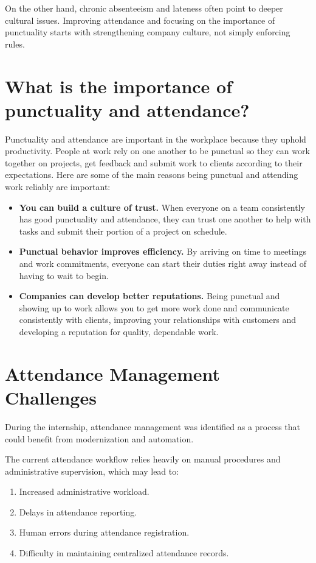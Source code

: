 \documentclass[sommairechap,stylejchiquet]{these_gi}
\begin{document}
On the other hand, chronic absenteeism and lateness often point to deeper cultural issues. Improving attendance and focusing on the importance of punctuality starts with strengthening company culture, not simply enforcing rules.

\section{What is the importance of punctuality and attendance?}
Punctuality and attendance are important in the workplace because they uphold productivity. People at work rely on one another to be punctual so they can work together on projects, get feedback and submit work to clients according to their expectations. Here are some of the main reasons being punctual and attending work reliably are important:
\begin{itemize}
    \item \textbf{You can build a culture of trust.} When everyone on a team consistently has good punctuality and attendance, they can trust one another to help with tasks and submit their portion of a project on schedule.
    \item \textbf{Punctual behavior improves efficiency.} By arriving on time to meetings and work commitments, everyone can start their duties right away instead of having to wait to begin.
    \item \textbf{Companies can develop better reputations.} Being punctual and showing up to work allows you to get more work done and communicate consistently with clients, improving your relationships with customers and developing a reputation for quality, dependable work.
\end{itemize}

\section{Attendance Management Challenges}

During the internship, attendance management was identified as a process that could benefit from modernization and automation.

The current attendance workflow relies heavily on manual procedures and administrative supervision, which may lead to:

\begin{enumerate}
    \item Increased administrative workload.
    \item Delays in attendance reporting.
    \item Human errors during attendance registration.
    \item Difficulty in maintaining centralized attendance records.
\end{enumerate}
\end{document}
